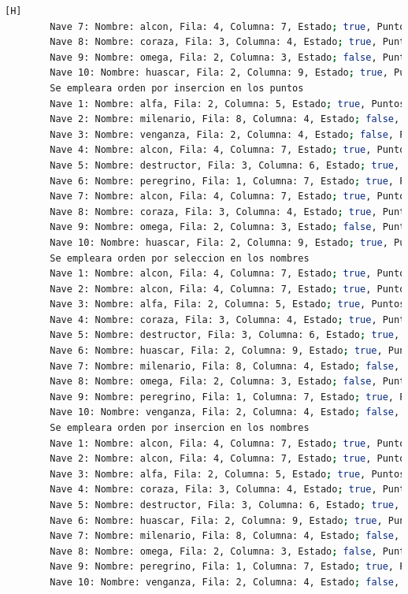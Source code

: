 \documentclass{article}
\begin{document}
\begin{lstlisting}[language=bash,caption={Probando DemoBatalla.java }][H]
	    Nave 7: Nombre: alcon, Fila: 4, Columna: 7, Estado; true, Puntos: 53
	    Nave 8: Nombre: coraza, Fila: 3, Columna: 4, Estado; true, Puntos: 54
	    Nave 9: Nombre: omega, Fila: 2, Columna: 3, Estado; false, Puntos: 56
	    Nave 10: Nombre: huascar, Fila: 2, Columna: 9, Estado; true, Puntos: 80
	    Se empleara orden por insercion en los puntos
	    Nave 1: Nombre: alfa, Fila: 2, Columna: 5, Estado; true, Puntos: 15
	    Nave 2: Nombre: milenario, Fila: 8, Columna: 4, Estado; false, Puntos: 30
	    Nave 3: Nombre: venganza, Fila: 2, Columna: 4, Estado; false, Puntos: 32
	    Nave 4: Nombre: alcon, Fila: 4, Columna: 7, Estado; true, Puntos: 43
	    Nave 5: Nombre: destructor, Fila: 3, Columna: 6, Estado; true, Puntos: 47
	    Nave 6: Nombre: peregrino, Fila: 1, Columna: 7, Estado; true, Puntos: 49
	    Nave 7: Nombre: alcon, Fila: 4, Columna: 7, Estado; true, Puntos: 53
	    Nave 8: Nombre: coraza, Fila: 3, Columna: 4, Estado; true, Puntos: 54
	    Nave 9: Nombre: omega, Fila: 2, Columna: 3, Estado; false, Puntos: 56
	    Nave 10: Nombre: huascar, Fila: 2, Columna: 9, Estado; true, Puntos: 80
	    Se empleara orden por seleccion en los nombres
	    Nave 1: Nombre: alcon, Fila: 4, Columna: 7, Estado; true, Puntos: 43
	    Nave 2: Nombre: alcon, Fila: 4, Columna: 7, Estado; true, Puntos: 53
	    Nave 3: Nombre: alfa, Fila: 2, Columna: 5, Estado; true, Puntos: 15
	    Nave 4: Nombre: coraza, Fila: 3, Columna: 4, Estado; true, Puntos: 54
	    Nave 5: Nombre: destructor, Fila: 3, Columna: 6, Estado; true, Puntos: 47
	    Nave 6: Nombre: huascar, Fila: 2, Columna: 9, Estado; true, Puntos: 80
	    Nave 7: Nombre: milenario, Fila: 8, Columna: 4, Estado; false, Puntos: 30
	    Nave 8: Nombre: omega, Fila: 2, Columna: 3, Estado; false, Puntos: 56
	    Nave 9: Nombre: peregrino, Fila: 1, Columna: 7, Estado; true, Puntos: 49
	    Nave 10: Nombre: venganza, Fila: 2, Columna: 4, Estado; false, Puntos: 32
	    Se empleara orden por insercion en los nombres
	    Nave 1: Nombre: alcon, Fila: 4, Columna: 7, Estado; true, Puntos: 43
	    Nave 2: Nombre: alcon, Fila: 4, Columna: 7, Estado; true, Puntos: 53
	    Nave 3: Nombre: alfa, Fila: 2, Columna: 5, Estado; true, Puntos: 15
	    Nave 4: Nombre: coraza, Fila: 3, Columna: 4, Estado; true, Puntos: 54
	    Nave 5: Nombre: destructor, Fila: 3, Columna: 6, Estado; true, Puntos: 47
	    Nave 6: Nombre: huascar, Fila: 2, Columna: 9, Estado; true, Puntos: 80
	    Nave 7: Nombre: milenario, Fila: 8, Columna: 4, Estado; false, Puntos: 30
	    Nave 8: Nombre: omega, Fila: 2, Columna: 3, Estado; false, Puntos: 56
	    Nave 9: Nombre: peregrino, Fila: 1, Columna: 7, Estado; true, Puntos: 49
	    Nave 10: Nombre: venganza, Fila: 2, Columna: 4, Estado; false, Puntos: 32
	\end{lstlisting}
	
\end{document}
